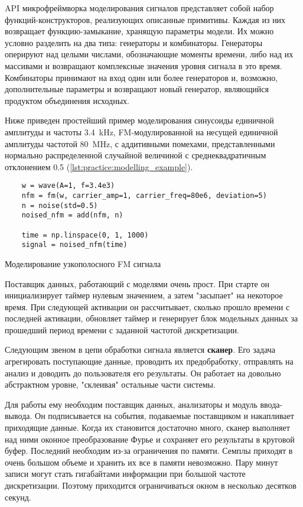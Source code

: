 API микрофреймворка моделирования сигналов представляет собой набор функций-конструкторов, реализующих описанные примитивы. Каждая из них возвращает функцию-замыкание, хранящую параметры модели. Их можно условно разделить на два типа: генераторы и комбинаторы. Генераторы оперируют над целыми числами, обозначающие моменты времени, либо над их массивами и возвращают комплексные значения уровня сигнала в это время. Комбинаторы принимают на вход один или более генераторов и, возможно, дополнительные параметры и возвращают новый генератор, являющийся продуктом объединения исходных.

Ниже приведен простейший пример моделирования синусоиды единичной амплитуды и частоты \SI{3.4}{\kilo\hertz}, FM-модулированной на несущей единичной амплитуды частотой \SI{80}{\mega\hertz}, с аддитивными помехами, представленными нормально распределенной случайной величиной с среднеквадратичным отклонением \num{0.5} (\autoref{lst:practice:modelling_example}).

\begin{listing}
  \begin{verbatim}
    w = wave(A=1, f=3.4e3)
    nfm = fm(w, carrier_amp=1, carrier_freq=80e6, deviation=5)
    n = noise(std=0.5)
    noised_nfm = add(nfm, n)

    time = np.linspace(0, 1, 1000)
    signal = noised_nfm(time)
  \end{verbatim}
  \caption{Моделирование узкополосного FM сигнала}
  \label{lst:practice:modelling_example}
\end{listing}

Поставщик данных, работающий с моделями очень прост. При старте он инициализирует таймер нулевым значением, а затем "засыпает" на некоторое время. При следующей активации он рассчитывает, сколько прошло времени с последней активации, обновляет таймер и генерирует блок модельных данных за прошедший период времени с заданной частотой дискретизации.

Следующим звеном в цепи обработки сигнала является \textbf{сканер}. Его задача агрегировать поступающие данные, проводить их предобработку, отправлять на анализ и доводить до пользователя его результаты. Он работает на довольно абстрактном уровне, "склеивая" остальные части системы.

Для работы ему необходим поставщик данных, анализаторы и модуль ввода-вывода. Он подписывается на события, подаваемые поставщиком и накапливает приходящие данные. Когда их становится достаточно много, сканер выполняет над ними оконное преобразование Фурье и сохраняет его результаты в круговой буфер. Последний необходим из-за ограничения по памяти. Семплы приходят в очень большом объеме и хранить их все в памяти невозможно. Пару минут записи могут стать гигабайтами информации при большой частоте дискретизации. Поэтому приходится ограничиваться окном в несколько десятков секунд.

